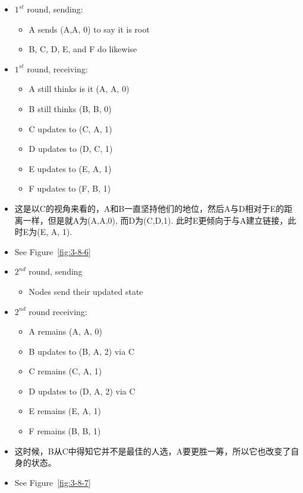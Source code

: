 \documentclass[12pt]{ctexart}   %
\begin{document}
	\begin{itemize}
		\item $1^{st}$ round, sending:
		\begin{itemize}
			\item A sends (A,A, 0) to say it is root
			\item B, C, D, E, and F do likewise
		\end{itemize}
		
		\item $1^{st}$ round, receiving:
		\begin{itemize}
			\item A still thinks is it (A, A, 0)
			\item B still thinks (B, B, 0)
			\item C updates to (C, A, 1)
			\item D updates to (D, C, 1)
			\item E updates to (E, A, 1)
			\item F updates to (F, B, 1)
		\end{itemize}
		
		\item 这是以C的视角来看的，A和B一直坚持他们的地位，然后A与D相对于E的距离一样，但是就A为(A,A,0), 而D为(C,D,1). 此时E更倾向于与A建立链接，此时E为(E, A, 1). 
		\item See Figure~\ref{fig:3-8-6}
		
		\item $2^{nd}$ round, sending
		\begin{itemize}
			\item Nodes send their updated state
		\end{itemize}
		
		\item $2^{nd}$ round receiving:
		\begin{itemize}
			\item A remains (A, A, 0)
			\item B updates to (B, A, 2) via C
			\item C remains (C, A, 1)
			\item D updates to (D, A, 2) via C
			\item E remains (E, A, 1)
			\item F remains (B, B, 1)
		\end{itemize}
		
		\item 这时候，B从C中得知它并不是最佳的人选，A要更胜一筹，所以它也改变了自身的状态。
		\item See Figure~\ref{fig:3-8-7}
		

\end{itemize}
\end{document}
